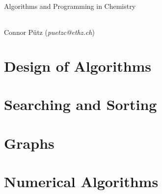 \documentclass[a4paper,11pt]{scrartcl}
\begin{document}
\thispagestyle{empty}

\begin{center}
\begin{LARGE}\sectfont
Algorithms and Programming in Chemistry
\end{LARGE}\\\vspace{0.5cm}
Connor Pütz (\textit{puetzc@ethz.ch})
\\\vspace{1cm}
\end{center}

\tableofcontents


\newpage\section{Design of Algorithms}


\newpage\section{Searching and Sorting}

\newpage\section{Graphs}


\newpage\section{Numerical Algorithms}



\end{document}
